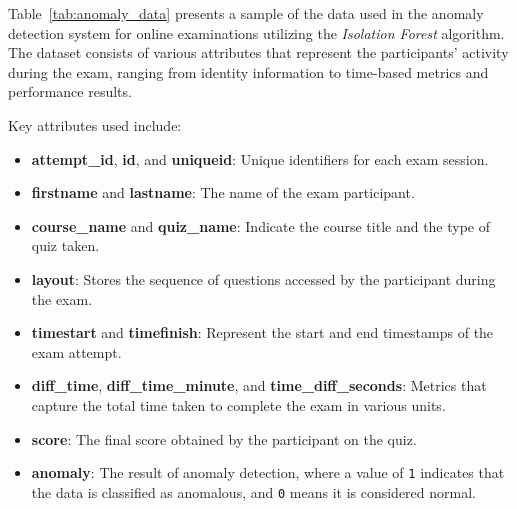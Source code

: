 Table~\ref{tab:anomaly_data} presents a sample of the data used in the anomaly detection system for online examinations utilizing the \textit{Isolation Forest} algorithm. The dataset consists of various attributes that represent the participants' activity during the exam, ranging from identity information to time-based metrics and performance results.

Key attributes used include:

\begin{itemize}
	\item \textbf{attempt\_id}, \textbf{id}, and \textbf{uniqueid}: Unique identifiers for each exam session.
	\item \textbf{firstname} and \textbf{lastname}: The name of the exam participant.
	\item \textbf{course\_name} and \textbf{quiz\_name}: Indicate the course title and the type of quiz taken.
	\item \textbf{layout}: Stores the sequence of questions accessed by the participant during the exam.
	\item \textbf{timestart} and \textbf{timefinish}: Represent the start and end timestamps of the exam attempt.
	\item \textbf{diff\_time}, \textbf{diff\_time\_minute}, and \textbf{time\_diff\_seconds}: Metrics that capture the total time taken to complete the exam in various units.
	\item \textbf{score}: The final score obtained by the participant on the quiz.
	\item \textbf{anomaly}: The result of anomaly detection, where a value of \texttt{1} indicates that the data is classified as anomalous, and \texttt{0} means it is considered normal.
\end{itemize}





